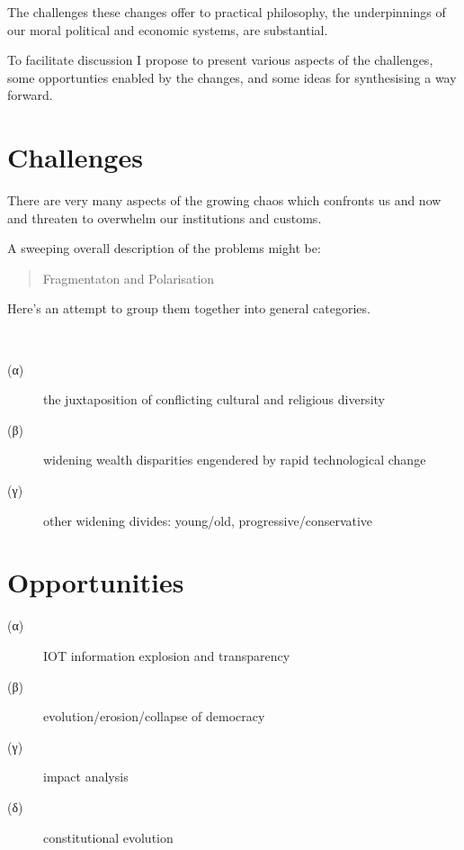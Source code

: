\documentclass[14pt,titlepage]{extarticle}
\begin{document}
The challenges these changes offer to practical philosophy, the underpinnings of our moral political and economic systems, are substantial.

To facilitate discussion I propose to present various aspects of the challenges, some opportunties enabled by the changes, and some ideas for synthesising a way forward.

\section{Challenges}

There are very many aspects of the growing chaos which confronts us and now and threaten to overwhelm our institutions and customs.

A sweeping overall description of the problems might be:

\begin{quote}
Fragmentaton and Polarisation
\end{quote}

Here's an attempt to group them together into general categories.

\

\hfill\begin{minipage}{\dimexpr\textwidth-1cm}
\begin{description}
\item[(α)] the juxtaposition of conflicting cultural and religious diversity
\item[(β)] widening wealth disparities engendered by rapid technological change
\item[(γ)] other widening divides: young/old, progressive/conservative
\end{description}
\end{minipage}

\section{Opportunities}

\hfill\begin{minipage}{\dimexpr\textwidth-1cm}
\begin{description}
\item[(α)] IOT information explosion and transparency
\item[(β)] evolution/erosion/collapse of democracy
\item[(γ)] impact analysis
\item[(δ)] constitutional evolution
\end{description}
\end{minipage}
\end{document}
